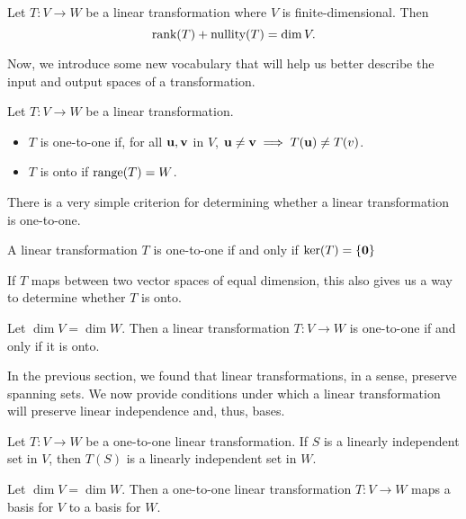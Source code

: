 \documentclass[../m073main.tex]{subfiles}
\begin{document}
\begin{theorem}
	Let $T : V \to W$ be a linear transformation where $V$ is finite-dimensional.
	Then
	\[ \textrm{rank}(T) + \textrm{nullity}(T) = \dim V. \]
\end{theorem}

Now, we introduce some new vocabulary that will help us better describe the input and output spaces of a transformation.

\begin{definition}
	Let $T : V \to W$ be a linear transformation.
	\begin{itemize}
		\item $T$ is one-to-one if, for all $\mathbf{u}, \mathbf{v}$ in $V$, $\mathbf{u} \neq \mathbf{v} \implies T(\mathbf{u}) \neq T(v)$.
		\item $T$ is onto if $\textrm{range}(T) = W$.
	\end{itemize}
\end{definition}

There is a very simple criterion for determining whether a linear transformation is one-to-one.

\begin{theorem}
	A linear transformation $T$ is one-to-one if and only if $\textrm{ker}(T) = \{\mathbf{0}\}$
\end{theorem}

If $T$ maps between two vector spaces of equal dimension, this also gives us a way to determine whether $T$ is onto.

\begin{theorem}
	Let $\dim V = \dim W$.
	Then a linear transformation $T : V \to W$ is one-to-one if and only if it is onto.
\end{theorem}

In the previous section, we found that linear transformations, in a sense, preserve spanning sets.
We now provide conditions under which a linear transformation will preserve linear independence and, thus, bases.

\begin{theorem}
	Let $T : V \to W$ be a one-to-one linear transformation.
	If $S$ is a linearly independent set in $V$, then $T(S)$ is a linearly independent set in $W$.
\end{theorem}

\begin{corollary}
	Let $\dim V = \dim W$.
	Then a one-to-one linear transformation $T : V \to W$ maps a basis for $V$ to a basis for $W$.
\end{corollary}
\end{document}
